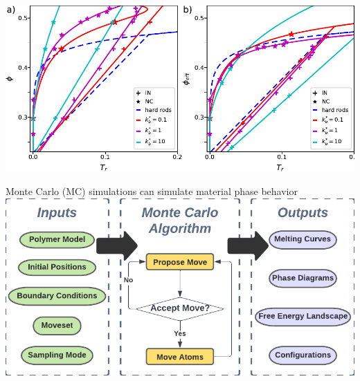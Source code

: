 \documentclass[aspectratio=169]{beamer}
\begin{document}
\begin{frame}[c]{}

  \centering
  \includegraphics[width=\textwidth]{../figures/ch5_soft_from_diss/figs-soft_harm_harm/fig-phase_diag_all/fig-phase_diag_phiHS.pdf}

\end{frame}

\begin{frame}{Monte Carlo (MC) simulations can simulate material phase behavior}
  \centering
  \includegraphics[]{figs/fig-MC_alg_inputs_outputs.pdf}
\end{frame}
\end{document}
